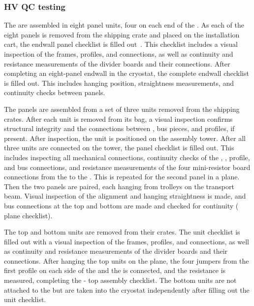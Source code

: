 \subsubsection{HV QC testing}

The  are assembled in eight panel units, four on each end of the .  
As each of the eight panels is  removed from the shipping crate and placed on the installation cart, the endwall panel checklist is filled out~\cite{bib:docdb10452}.
This checklist includes a visual inspection of the frames, profiles, and connections, as well as continuity and resistance measurements of the divider boards and their connections.  
After completing an eight-panel endwall in the cryostat, the complete endwall checklist is filled out.  
This includes hanging position, straightness measurements, and continuity checks between panels.

The  panels are assembled from a set of three units removed from the shipping crates.  
After each unit is removed from its bag, a visual inspection confirms structural integrity and the connections between ,  bus pieces, and profiles, if present.  
After inspection, the unit is positioned on the  assembly tower.  
After all three units are connected on the tower, the  panel checklist is filled out.  
This includes inspecting all mechanical connections, continuity checks of the , , profile, and  bus connections, and resistance measurements of the four mini-resistor board connections from the  to the .  
This is repeated for the second panel in a  plane.  Then the two panels are paired, each hanging from trolleys on the transport beam.  
Visual inspection of the alignment and hanging straightness is made, and  bus connections at the top and bottom are made and checked for continuity ( plane checklist).

The  top and bottom units are removed from their crates.  The  unit checklist is filled out with a visual inspection of the frames, profiles, and connections, as well as continuity and resistance measurements of the divider boards and their connections.  
After hanging the top  units on the  plane, the four jumpers from the first  profile on each side of the  and the   is connected, and the resistance is measured, completing the - top assembly checklist. 
The  bottom units are not attached to the  but are taken into the cryostat independently after filling out the  unit checklist.

